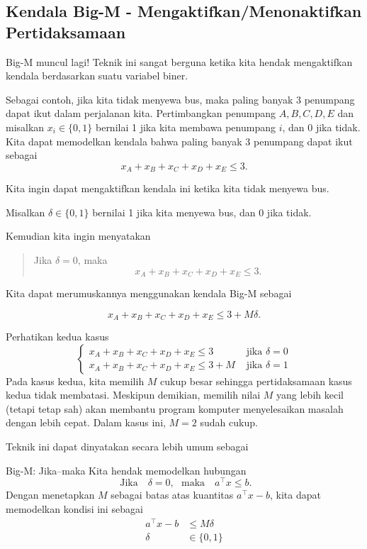 \subsection{Kendala Big-M - Mengaktifkan/Menonaktifkan Pertidaksamaan}
\label{subsec:big-M-activation}
Big-M muncul lagi! Teknik ini sangat berguna ketika kita hendak mengaktifkan kendala berdasarkan suatu variabel biner.

Sebagai contoh, jika kita tidak menyewa bus, maka paling banyak 3 penumpang dapat ikut dalam perjalanan kita. Pertimbangkan penumpang $A,B,C,D,E$ dan misalkan $x_i \in \{0,1\}$ bernilai 1 jika kita membawa penumpang $i$, dan 0 jika tidak.
Kita dapat memodelkan kendala bahwa paling banyak 3 penumpang dapat ikut sebagai
$$
x_A + x_B + x_C + x_D + x_E \leq 3.
$$

Kita ingin dapat mengaktifkan kendala ini ketika kita tidak menyewa bus.

Misalkan $\delta \in \{0,1\}$ bernilai 1 jika kita menyewa bus, dan 0 jika tidak.

Kemudian kita ingin menyatakan
\begin{quote}
Jika $\delta = 0$, maka
$$
x_A + x_B + x_C + x_D + x_E \leq 3.
$$
\end{quote}

Kita dapat merumuskannya menggunakan kendala Big-M sebagai

\begin{equation}
x_A + x_B + x_C + x_D + x_E \leq 3 + M \delta.
\end{equation}

Perhatikan kedua kasus
$$
\begin{cases}
x_A + x_B + x_C + x_D + x_E \leq 3  & \text{ jika } \delta = 0\\
x_A + x_B + x_C + x_D + x_E \leq 3 +M & \text{ jika } \delta = 1
\end{cases}
$$
Pada kasus kedua, kita memilih $M$ cukup besar sehingga pertidaksamaan kasus kedua tidak membatasi. Meskipun demikian, memilih nilai $M$ yang lebih kecil (tetapi tetap sah) akan membantu program komputer menyelesaikan masalah dengan lebih cepat. Dalam kasus ini, $M = 2$ sudah cukup.

Teknik ini dapat dinyatakan secara lebih umum sebagai
\begin{general}{Big-M: Jika--maka}{}{}
Kita hendak memodelkan hubungan
\begin{equation}
\text{ Jika } \ \ \   \delta = 0, \ \ \  \text{maka } \ \ \ a^\top x \leq b.
\end{equation}
Dengan menetapkan $M$ sebagai batas atas kuantitas $a^\top x - b$, kita dapat memodelkan kondisi ini sebagai
\begin{equation}
\begin{split}
a^\top x - b& \leq M\delta\\
\delta & \in \{0,1\}
\end{split}
\end{equation}
\end{general}

